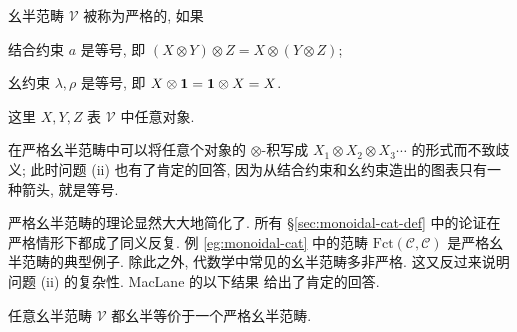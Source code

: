\begin{definition}\label{def:strict-monoidal-cat}
	幺半范畴 $\mathcal{V}$ 被称为严格的, 如果
	\begin{compactitem}
		\item 结合约束 $a$ 是等号, 即 $(X \otimes Y) \otimes Z = X \otimes (Y \otimes Z)$;
		\item 幺约束 $\lambda, \rho$ 是等号, 即 $X \otimes \mathbf{1} = \mathbf{1} \otimes X = X$.
	\end{compactitem}
	这里 $X,Y,Z$ 表 $\mathcal{V}$ 中任意对象.
\end{definition}
在严格幺半范畴中可以将任意个对象的 $\otimes$-积写成 $X_1 \otimes X_2 \otimes X_3 \cdots$ 的形式而不致歧义; 此时问题 (ii) 也有了肯定的回答, 因为从结合约束和幺约束造出的图表只有一种箭头, 就是等号.

严格幺半范畴的理论显然大大地简化了. 所有 \S\ref{sec:monoidal-cat-def} 中的论证在严格情形下都成了同义反复. 例 \ref{eg:monoidal-cat} 中的范畴 $\text{Fct}(\mathcal{C}, \mathcal{C})$ 是严格幺半范畴的典型例子. 除此之外, 代数学中常见的幺半范畴多非严格. 这又反过来说明问题 (ii) 的复杂性. MacLane 的以下结果 \cite[VII.2]{ML98} 给出了肯定的回答.

\begin{theorem}[S.\ MacLane]\label{prop:ML-coherence}
	任意幺半范畴 $\mathcal{V}$ 都幺半等价于一个严格幺半范畴.
\end{theorem}

